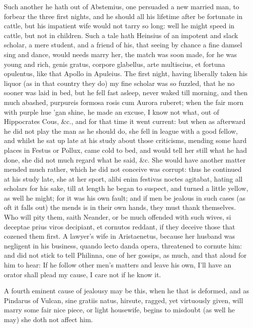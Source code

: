 {Such another he hath out of Abstemius, one persuaded a new married man,
to forbear the three first nights, and he should all his lifetime
after be fortunate in cattle, but his impatient wife would not tarry so
long: well he might speed in cattle, but not in children. Such a tale
hath Heinsius of an impotent and slack scholar, a mere student, and a
friend of his, that seeing by chance a fine damsel sing and dance,
would needs marry her, the match was soon made, for he was young and
rich, genis gratus, corpore glabellus, arte multiscius, et fortuna
opulentus, like that Apollo in Apuleius. The first night, having
liberally taken his liquor (as in that country they do) my fine scholar
was so fuzzled, that he no sooner was laid in bed, but he fell fast
asleep, never waked till morning, and then much abashed, purpureis
formosa rosis cum Aurora ruberet; when the fair morn with purple hue
'gan shine, he made an excuse, I know not what, out of Hippocrates
Cous, \&c., and for that time it went current: but when as afterward he
did not play the man as he should do, she fell in league with a good
fellow, and whilst he sat up late at his study about those criticisms,
mending some hard places in Festus or Pollux, came cold to bed, and
would tell her still what he had done, she did not much regard what he
said, \&c. She would have another matter mended much rather, which
he did not conceive was corrupt: thus he continued at his study late,
she at her sport, alibi enim festivas noctes agitabat, hating all
scholars for his sake, till at length he began to suspect, and turned a
little yellow, as well he might; for it was his own fault; and if men
be jealous in such cases (as oft it falls out) the mends is in
their own hands, they must thank themselves. Who will pity them, saith
Neander, or be much offended with such wives, si deceptae prius viros
decipiant, et cornutos reddant, if they deceive those that cozened them
first. A lawyer's wife in Aristaenetus, because her husband was
negligent in his business, quando lecto danda opera, threatened to
cornute him: and did not stick to tell Philinna, one of her gossips, as
much, and that aloud for him to hear: If he follow other men's matters
and leave his own, I'll have an orator shall plead my cause, I care not
if he know it.

A fourth eminent cause of jealousy may be this, when he that is
deformed, and as Pindarus of Vulcan, sine gratiis natus, hirsute,
ragged, yet virtuously given, will marry some fair nice piece, or light
housewife, begins to misdoubt (as well he may) she doth not affect him.

}
